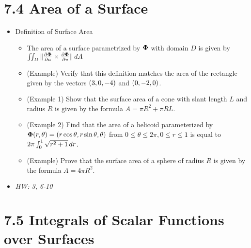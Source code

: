 \documentclass[11pt]{article}
\begin{document}
\section*{7.4 Area of a Surface}

\begin{itemize}
  \item Definition of Surface Area
    \begin{itemize}
      \item The area of a surface parametrized by \(\mathbf{\Phi}\) with domain
            \(D\) is given by
            \(
              \iint_D
                \|\frac{\partial\mathbf{\Phi}}{\partial u}\times\frac{\partial\mathbf{\Phi}}{\partial v}\|
              \,d A
            \)
      \item (Example) Verify that this definition matches the area of the
            rectangle given by the vectors \(\left(3,0,-4\right)\) and \(\left(0,-2,0\right)\).
      \item (Example 1) Show that the surface area of a cone with slant length
            \(L\) and radius \(R\) is given by the formula
            \(A=\pi R^2+\pi RL\).
      \item (Example 2) Find that the area of a helicoid parameterized by
            \(\mathbf{\Phi}(r,\theta)=\left(r\cos\theta,r\sin\theta,\theta\right)\)
            from \(0\leq\theta\leq2\pi,0\leq r\leq 1\) is
            equal to \(2\pi\int_0^1\sqrt{r^2+1}\,d r\).
      \item (Example) Prove that the surface area of a sphere of radius
            \(R\) is given by the formula \(A=4\pi R^2\).
    \end{itemize}
  \item\textit{
    HW: 3, 6-10
  }
\end{itemize}

\section*{7.5 Integrals of Scalar Functions over Surfaces}
\end{document}
